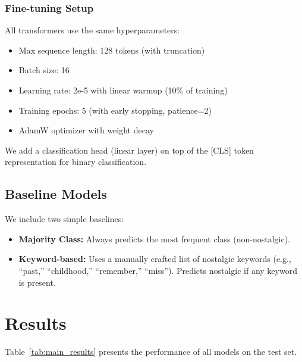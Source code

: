 \documentclass[conference]{IEEEtran}
\begin{document}
\subsubsection{Fine-tuning Setup}
All transformers use the same hyperparameters:
\begin{itemize}
\item Max sequence length: 128 tokens (with truncation)
\item Batch size: 16
\item Learning rate: 2e-5 with linear warmup (10\% of training)
\item Training epochs: 5 (with early stopping, patience=2)
\item AdamW optimizer with weight decay
\end{itemize}

We add a classification head (linear layer) on top of the [CLS] token representation for binary classification.

\subsection{Baseline Models}

We include two simple baselines:
\begin{itemize}
\item \textbf{Majority Class:} Always predicts the most frequent class (non-nostalgic).
\item \textbf{Keyword-based:} Uses a manually crafted list of nostalgic keywords (e.g., ``past,'' ``childhood,'' ``remember,'' ``miss''). Predicts nostalgic if any keyword is present.
\end{itemize}

\section{Results}

Table~\ref{tab:main_results} presents the performance of all models on the test set.
\end{document}
